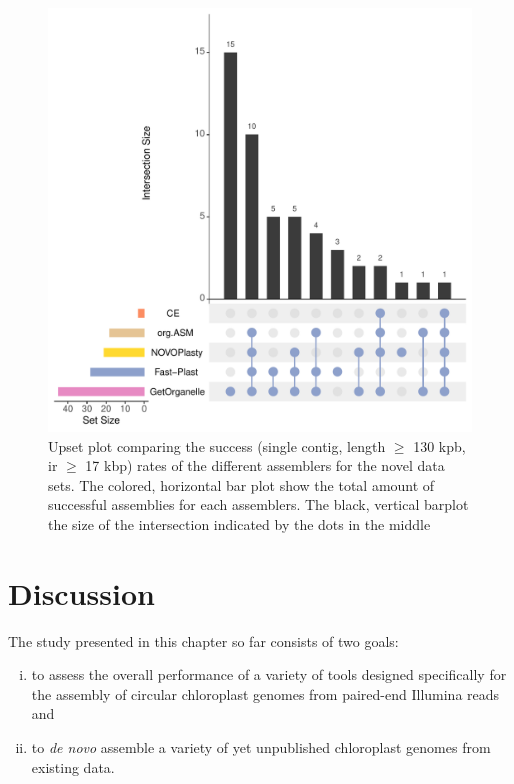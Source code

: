 \begin{figure}[H]
\centering
\includegraphics[height=.45\textheight, width=.95\textwidth]{Figures/upset_novel}
\decoRule
\caption[Upset plot comparing the success rates for novel data
sets]{Upset plot comparing the success (single contig, length $\geq$
  130 kpb, ir $\geq$ 17 kbp) rates of the different assemblers for the
  novel data sets. The colored, horizontal bar plot show the total
  amount of successful assemblies for each assemblers. The black,
  vertical barplot the size of the intersection indicated by the dots
  in the middle}
\label{fig:upset_novel}
\end{figure}

\section{Discussion} \label{dis_cp}

The study presented in this chapter so far consists of two goals:
\begin{enumerate}[(i)]
\item to assess the overall performance of a variety of tools designed specifically for
  the assembly of circular chloroplast genomes from paired-end Illumina reads and
\item to \textit{de novo} assemble a variety of yet unpublished chloroplast genomes from existing data.
\end{enumerate}

